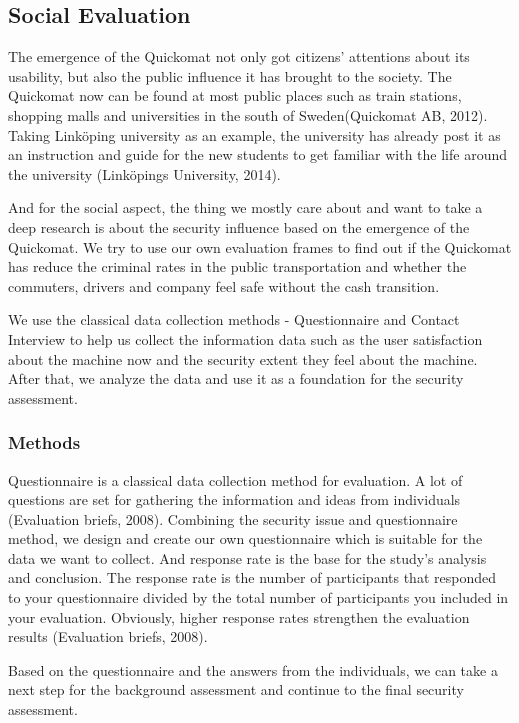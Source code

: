 \documentclass[twocolumn]{article}
\begin{document}
\subsection{Social Evaluation}
The emergence of the Quickomat not only got citizens’ attentions about its usability, but also the public influence it has brought to the society. The Quickomat now can be found at most public places such as train stations, shopping malls and universities in the south of Sweden(Quickomat AB, 2012). Taking Linköping university as an example, the university has already post it as an instruction and guide for the new students to get familiar with the life around the university (Linköpings University, 2014). 

And for the social aspect, the thing we mostly care about and want to take a deep research is about the security influence based on the emergence of the Quickomat. We try to use our own evaluation frames to find out if the Quickomat has reduce the criminal rates in the public transportation and whether the commuters, drivers and company feel safe without the cash transition. 

We use the classical data collection methods - Questionnaire and Contact Interview to help us collect the information data such as the user satisfaction about the machine now and the security extent they feel about the machine.
After that, we analyze the data and use it as a foundation for the security assessment.

\subsubsection{Methods}
Questionnaire is a classical data collection method for evaluation. A lot of questions are set for gathering the information and ideas from individuals (Evaluation briefs, 2008). Combining the security issue and questionnaire method, we design and create our own questionnaire which is suitable for the data we want to collect. And response rate is the base for the study’s analysis and conclusion. The response rate is the number of participants that responded to your questionnaire divided by the total number of participants you included in your evaluation. Obviously, higher response rates strengthen the evaluation results (Evaluation briefs, 2008). 

Based on the questionnaire and the answers from the individuals, we can take a next step for the background assessment and continue to the final security assessment.
\end{document}

